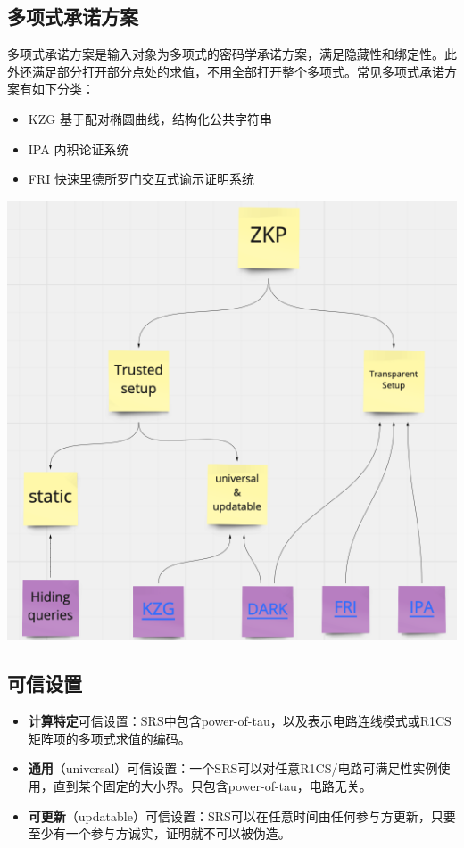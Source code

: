 \documentclass[runningheads]{llncs}
\begin{document}
\subsection*{多项式承诺方案}
多项式承诺方案是输入对象为多项式的密码学承诺方案，满足隐藏性和绑定性。此外还满足部分打开部分点处的求值，不用全部打开整个多项式。常见多项式承诺方案有如下分类：

\begin{itemize}
  \item KZG \cite{KZG10} 基于配对椭圆曲线，结构化公共字符串
  \item IPA \cite{BBB18} 内积论证系统
  \item FRI \cite{BBH17} 快速里德所罗门交互式谕示证明系统
\end{itemize}

\includegraphics[scale=0.5]{pc.png}


\subsection*{可信设置}

\begin{itemize}
  \item \textbf{计算特定}可信设置：SRS中包含power-of-tau，以及表示电路连线模式或R1CS矩阵项的多项式求值的编码。
  
  \item \textbf{通用}（universal）可信设置：一个SRS可以对任意R1CS/电路可满足性实例使用，直到某个固定的大小界。只包含power-of-tau，电路无关。
  
  \item \textbf{可更新}（updatable）可信设置：SRS可以在任意时间由任何参与方更新，只要至少有一个参与方诚实，证明就不可以被伪造。
\end{itemize}
\end{document}
